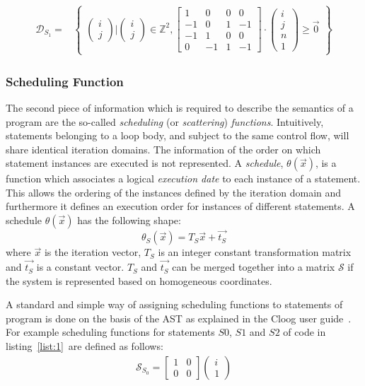 \begin{align*}
\mathcal{D}_{S_1} = & \begin{Bmatrix} 
	\begin{pmatrix} i \\ j \end{pmatrix} \big|
	\begin{pmatrix} i \\ j \end{pmatrix} \in \mathbb{Z}^2,
	\begin{bmatrix} 1 & 0 & 0 & 0\\ -1 & 0 & 1 & -1 \\ 
			-1 & 1 & 0 & 0 \\  0 & -1 & 1 & -1 
	\end{bmatrix} \cdot
	\begin{pmatrix} i \\ j \\ n \\ 1 \end{pmatrix}
	\ge \vec{0}
\end{Bmatrix}
\end{align*}

\subsubsection{Scheduling Function}
The second piece of information which is required to describe the semantics of a
program are the so-called \emph{scheduling} (or \emph{scattering})
\emph{functions}. Intuitively, statements belonging to a loop body, and subject
to the same control flow, will share identical iteration domains. The
information of the order on which statement instances are executed is not
represented. A \emph{schedule}, $\theta(\vec{x})$, is a function which
associates a logical \emph{execution date} to each instance of a statement. This
allows the ordering of the instances defined by the iteration domain and
furthermore it defines an execution order for instances of different statements.
A schedule $\theta(\vec{x})$ has the following shape:
\[
\theta_S (\vec{x}) = T_S\vec{x} + \vec{t_S}
\]
where $\vec{x}$ is the iteration vector, $T_S$ is an integer constant
transformation matrix and $\vec{t_S}$ is a constant vector. $T_S$ and
$\vec{t_S}$ can be merged together into a matrix $\mathcal{S}$ if the system is
represented based on homogeneous coordinates. 

A standard and simple way of assigning scheduling functions to statements of
program is done on the basis of the AST as explained in the Cloog user
guide~\cite{cloog}.
For example scheduling functions
for statements $S0$, $S1$ and $S2$ of code in listing~\ref{list:1}~are defined
as follows:
\begin{align*}
\mathcal{S}_{S_{0}} = \begin{bmatrix} 1 & 0 \\ 0 & 0 \end{bmatrix} 
					\begin{pmatrix} i \\ 1 \end{pmatrix} 
\end{align*}

